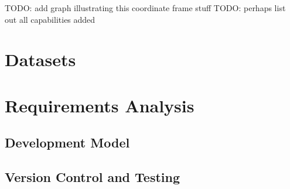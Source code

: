 TODO: add graph illustrating this coordinate frame stuff
TODO: perhaps list out all capabilities added

\section{Datasets}
\label{sec:datasets}

\section{Requirements Analysis}
\label{sec:requirements-analysis}

\subsection{Development Model}
\label{sec:development-model}

\subsection{Version Control and Testing}
\label{sec:version-control-and-testing}

